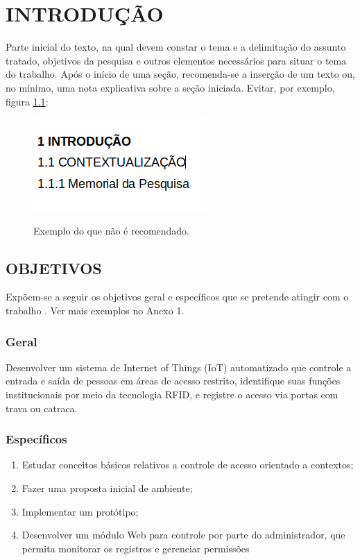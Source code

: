 \chapter{INTRODUÇÃO}\label{chp:INTRODUCAO}

Parte inicial do texto, na qual devem constar o tema e a delimitação do assunto tratado, objetivos da pesquisa e outros elementos necessários para situar o tema do trabalho. Após o início de uma seção, recomenda-se a inserção de um texto ou, no mínimo, uma nota explicativa sobre a seção iniciada. Evitar, por exemplo, figura \ref{fig:WhatNotToDo}:

\begin{figure}[htb]
	\centering
	\caption{Exemplo do que não é recomendado.}
	\includegraphics[scale=0.6]{imagens/what-not-to-do.png} 
	\label{fig:WhatNotToDo}
\end{figure}

\section{OBJETIVOS}\label{sec:OBJETIVOS}
Expõem-se a seguir os objetivos geral e específicos que se pretende atingir com o trabalho . Ver mais exemplos no Anexo 1. 

\subsection{Geral}\label{sec:Geral}
Desenvolver um sistema de Internet of Things (IoT) automatizado que controle a entrada e saída de pessoas em áreas de acesso restrito, identifique suas funções institucionais por meio da tecnologia RFID, e registre o acesso via portas com trava ou catraca.


\subsection{Específicos}\label{sec:Especificos}
\begin{enumerate}
	\item Estudar conceitos básicos relativos a controle de acesso orientado a contextos; 
	
	\item Fazer uma proposta inicial de ambiente;
	
	\item Implementar um protótipo;
	
	\item Desenvolver um módulo Web para controle por parte do administrador, que permita monitorar os registros e gerenciar permissões
\end{enumerate}



